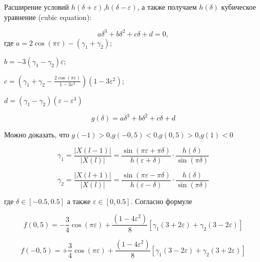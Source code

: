 Расширение условий $h(\delta +\varepsilon)$,$h(\delta -\varepsilon)$, а также получаем $h(\delta)$ кубическое уравнение (cubic equation):

\begin{equation}
\label{eq:equation34}
{a \delta}^3 + {b \delta}^2 + c \delta + d = 0, 
\end{equation}
где $a = 2 \cos(\pi \varepsilon)-(\gamma_1 + \gamma_2)$;

$b = -3(\gamma_1 - \gamma_2)\varepsilon$;

$c = \left( \gamma_1 + \gamma_2 - \frac{2 \cos(\pi \varepsilon)}{1-3\varepsilon^2}
\right) \left( {1-3\varepsilon^2} \right) $;

$d = ( \gamma_1 - \gamma_2)(\varepsilon - \varepsilon^3)$

\begin{equation}
\label{eq:equation35}
g(\delta) = {a \delta}^3 + {b \delta}^2 + c \delta + d
\end{equation}

Можно доказать, что $g(-1)>0$,$g(-0,5)<0$,$g(0,5)>0$,$g(1)<0$ 

\begin{equation}
\label{eq:equation36}
\gamma_1 = \frac{\left| X(l-1)\right|}{\left| X(l)\right|} = \frac{\sin({\pi \varepsilon + \pi \delta})}{h(\varepsilon + \delta)} \cdot \frac{h(\delta)}{\sin(\pi \delta)}
\end{equation}

\begin{equation}
\label{eq:equation37}
\gamma_2 = \frac{\left| X(l+1)\right|}{\left| X(l)\right|} = \frac{\sin({\pi \varepsilon - \pi \delta})}{h(\varepsilon - \delta)} \cdot \frac{h(\delta)}{\sin(\pi \delta)}
\end{equation}

где $\delta \in[-0.5,0.5]$ а также $\varepsilon\in[0,0.5]$. Согласно формуле 

\begin{equation}
\label{eq:equation38}
f(0,5) = -\frac{3}{4} \cos(\pi \varepsilon) + \frac{(1-4 \varepsilon^2)}{8} \left[ {\gamma_1 (3+2 \varepsilon)+\gamma_2 (3-2 \varepsilon)}\right] 
\end{equation}

\begin{equation}
\label{eq:equation39}
f(-0,5) = +\frac{3}{4} \cos(\pi \varepsilon) + \frac{(1-4 \varepsilon^2)}{8} \left[ {\gamma_1 (3-2 \varepsilon)+\gamma_2 (3+2 \varepsilon)}\right] 
\end{equation}

